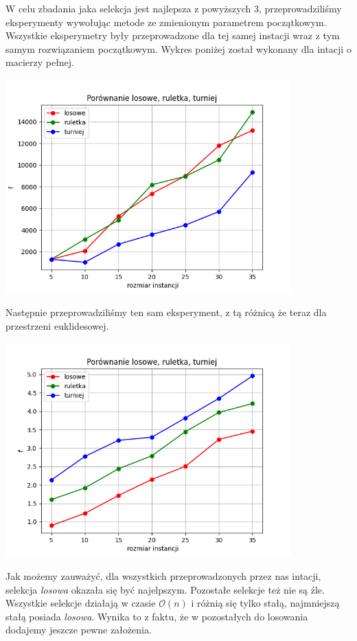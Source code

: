 \documentclass{article}
\begin{document}
    W celu zbadania jaka selekcja jest najlepsza z
    powyższych 3, przeprowadziliśmy eksperymenty wywołując
    metode ze zmienionym parametrem początkowym. Wszystkie
    eksperymetry były przeprowadzone dla tej samej instacji
    wraz z tym samym rozwiązaniem początkowym. Wykres poniżej
    został wykonany dla intacji o macierzy pełnej.

    \includegraphics[width=11cm]{./spr3img/Figure_1FULL.png}

    Następnie przeprowadziliśmy ten sam eksperyment, z tą różnicą
    że teraz dla przestrzeni euklidesowej.

   \includegraphics[width=11cm]{./spr3img/Figure_2.png}

    Jak możemy zauważyć, dla wszystkich przeprowadzonych
    przez nas intacji, selekcja \emph{losowa} okazała się być
    najelpszym. Pozostałe selekcje też nie są źle. Wszystkie
    selekcje działają w czasie $\mathcal{O}(n)$ i różnią się tylko
    stałą, najmniejszą stałą posiada \emph{losowa}. Wynika to z faktu,
    że w pozostałych do losowania dodajemy jeszcze pewne założenia.
\end{document}
